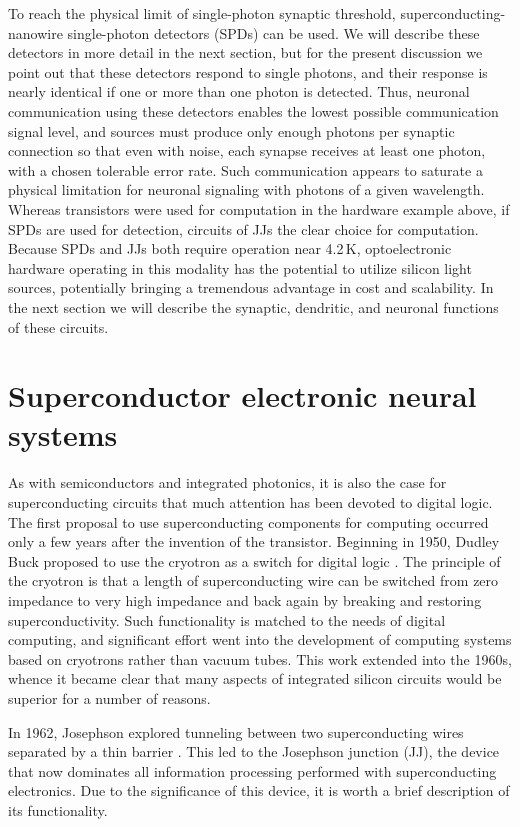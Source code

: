\documentclass[twocolumn]{article}
\begin{document}
To reach the physical limit of single-photon synaptic threshold, superconducting-nanowire single-photon detectors (SPDs) can be used. We will describe these detectors in more detail in the next section, but for the present discussion we point out that these detectors respond to single photons, and their response is nearly identical \cite{} if one or more than one photon is detected. Thus, neuronal communication using these detectors enables the lowest possible communication signal level, and sources must produce only enough photons per synaptic connection so that even with noise, each synapse receives at least one photon, with a chosen tolerable error rate. Such communication appears to saturate a physical limitation for neuronal signaling with photons of a given wavelength. Whereas transistors were used for computation in the hardware example above, if SPDs are used for detection, circuits of JJs the clear choice for computation. Because SPDs and JJs both require operation near 4.2\,K, optoelectronic hardware operating in this modality has the potential to utilize silicon light sources, potentially bringing a tremendous advantage in cost and scalability. In the next section we will describe the synaptic, dendritic, and neuronal functions of these circuits. 

\section{\label{sec:superconductors}Superconductor electronic neural systems}
As with semiconductors and integrated photonics, it is also the case for superconducting circuits that much attention has been devoted to digital logic. The first proposal to use superconducting components for computing occurred only a few years after the invention of the transistor. Beginning in 1950, Dudley Buck proposed to use the cryotron as a switch for digital logic \cite{bu1956,bu1950}. The principle of the cryotron is that a length of superconducting wire can be switched from zero impedance to very high impedance and back again by breaking and restoring superconductivity. Such functionality is matched to the needs of digital computing, and significant effort went into the development of computing systems based on cryotrons rather than vacuum tubes. This work extended into the 1960s, whence it became clear that many aspects of integrated silicon circuits would be superior for a number of reasons. 

In 1962, Josephson explored tunneling between two superconducting wires separated by a thin barrier \cite{jo1962}. This led to the Josephson junction (JJ), the device that now dominates all information processing performed with superconducting electronics. Due to the significance of this device, it is worth a brief description of its functionality. 
\end{document}
